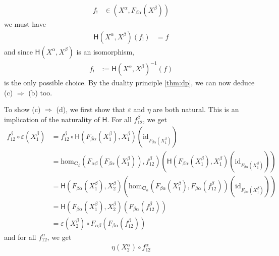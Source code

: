 \begin{prf}
\begin{description}
\begin{align*}
  f_{!}
  &\in
  \left(
    X^{\alpha},
    F_{\beta\alpha}
    \left(
      X^{\beta}
    \right)
  \right)
\end{align*}
we must have
\begin{align*}
  \mathsf{H}(X^{\alpha},X^{\beta})(f_{!})
  &=
  f
\end{align*}
and since $\mathsf{H}(X^{\alpha},X^{\beta})$ is an isomorphism,
\begin{align*}
  f_{!}
  &:=
  \mathsf{H}(X^{\alpha},X^{\beta})^{-1}(f)
\end{align*}
is the only possible choice.
By the duality principle \ref{thm:dp}, we can now deduce {\glqq}(c) $\Rightarrow$ (b){\grqq} too.
\item[Step 2]
To show {\glqq}(c) $\Rightarrow$ (d){\grqq}, we first show that $\varepsilon$ and $\eta$ are both natural.
This is an implication of the naturality of $\mathsf{H}$.
For all $f_{12}^{\beta}$, we get
\begin{align*}
  f_{12}^{\beta}
  \circ
  \varepsilon(X_{1}^{\beta})
  &=
  f_{12}^{\beta}
  \circ
  \mathsf{H}
  \left(
    F_{\beta\alpha}(X_{1}^{\beta}),
    X_{1}^{\beta}
  \right)
  \left(
    \mathrm{id}_{F_{\beta\alpha}(X_{1}^{\beta})}
  \right)
  \\
  &=
  \mathrm{hom}_{\mathbf{C}_{\beta}}
  \left(
    F_{\alpha\beta}
    \left(
      F_{\beta\alpha}(X_{1}^{\beta})
    \right),
    f_{12}^{\beta}
  \right)
  \left(
    \mathsf{H}
    \left(
      F_{\beta\alpha}(X_{1}^{\beta}),
      X_{1}^{\beta}
    \right)
    \left(
      \mathrm{id}_{F_{\beta\alpha}(X_{1}^{\beta})}
    \right)
  \right)
  \\
  &=
  \mathsf{H}
  \left(
    F_{\beta\alpha}(X_{1}^{\beta}),
    X_{2}^{\beta}
  \right)
  \left(
    \mathrm{hom}_{\mathbf{C}_{\alpha}}
    \left(
      F_{\beta\alpha}(X_{1}^{\beta}),
      F_{\beta\alpha}(f_{12}^{\beta})
    \right)
    \left(
      \mathrm{id}_{F_{\beta\alpha}(X_{1}^{\beta})}
    \right)
  \right)
  \tag{NT}
  \\
  &=
  \mathsf{H}
  \left(
    F_{\beta\alpha}(X_{1}^{\beta}),
    X_{2}^{\beta}
  \right)
  \left(
    F_{\beta\alpha}(f_{12}^{\beta})
  \right)
  \\
  &=
  \varepsilon(X_{2}^{\beta})
  \circ
  F_{\alpha\beta}
  \left(
    F_{\beta\alpha}(f_{12}^{\beta})
  \right)
\end{align*}
and for all $f_{12}^{\alpha}$, we get
\begin{align*}
  \eta(X_{2}^{\alpha})
  \circ
  f_{12}^{\alpha}

\end{align*}
\end{description}
\end{prf}
